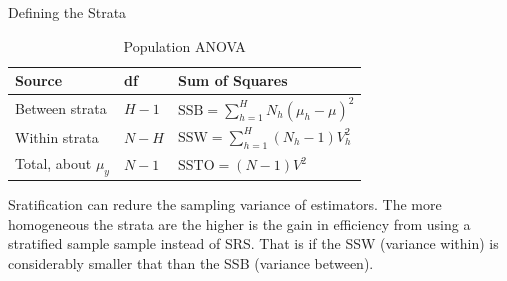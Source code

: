 \documentclass{beamer}\usepackage[]{graphicx}\usepackage[]{color}
\begin{document}
% 

\begin{frame}{Defining the Strata}
  \begin{table}\caption{Population ANOVA}
  \begin{tabular}{l | l | l }
  Source & df & Sum of Squares  \\
  \hline
   Between strata         & $H-1$ & $\text{SSB}  = \sum_{h=1}^H N_h ( \mu_{h} - \mu  )^2$  \\
   Within  strata         & $N-H$ & $\text{SSW}  = \sum_{h=1}^H (N_h-1) V_{h}^2$  \\
   Total,  about  $\mu_y$ & $N-1$ & $\text{SSTO} = (N-1) V^2$ \\
  \end{tabular}
  \end{table}
Sratification can redure the sampling variance of estimators. The more homogeneous the strata are the higher is the gain in efficiency from using a stratified sample sample instead of SRS. That is if the SSW (variance within) is
considerably smaller that than the SSB (variance between). 
\end{frame}
\end{document}
